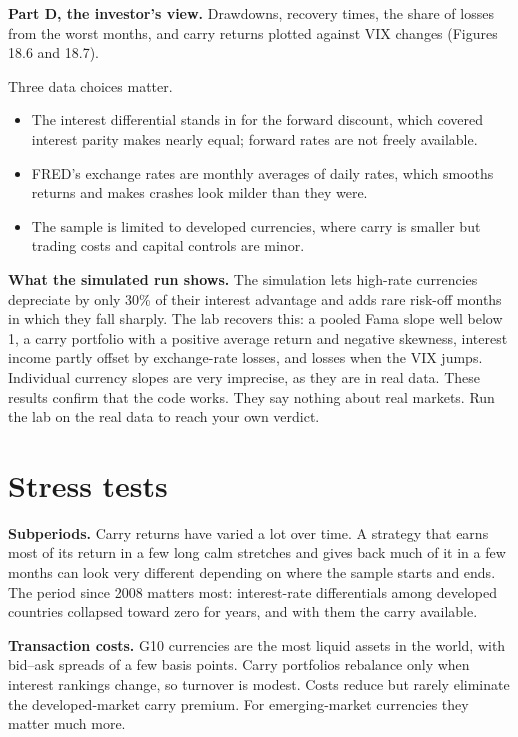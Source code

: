 \textbf{Part D, the investor's view.} Drawdowns, recovery times, the share of losses from the worst months, and carry returns plotted against VIX changes (Figures 18.6 and 18.7).

Three data choices matter.

\begin{itemize}
  \item The interest differential stands in for the forward discount, which covered interest parity makes nearly equal; forward rates are not freely available.
  \item FRED's exchange rates are monthly averages of daily rates, which smooths returns and makes crashes look milder than they were.
  \item The sample is limited to developed currencies, where carry is smaller but trading costs and capital controls are minor.
\end{itemize}

\textbf{What the simulated run shows.} The simulation lets high-rate currencies depreciate by only 30\% of their interest advantage and adds rare risk-off months in which they fall sharply. The lab recovers this: a pooled Fama slope well below 1, a carry portfolio with a positive average return and negative skewness, interest income partly offset by exchange-rate losses, and losses when the VIX jumps. Individual currency slopes are very imprecise, as they are in real data. These results confirm that the code works. They say nothing about real markets. Run the lab on the real data to reach your own verdict.

\section{Stress tests}
\label{sec:18-stress}

\textbf{Subperiods.} Carry returns have varied a lot over time. A strategy that earns most of its return in a few long calm stretches and gives back much of it in a few months can look very different depending on where the sample starts and ends. The period since 2008 matters most: interest-rate differentials among developed countries collapsed toward zero for years, and with them the carry available.

\textbf{Transaction costs.} G10 currencies are the most liquid assets in the world, with bid--ask spreads of a few basis points. Carry portfolios rebalance only when interest rankings change, so turnover is modest. Costs reduce but rarely eliminate the developed-market carry premium. For emerging-market currencies they matter much more.

